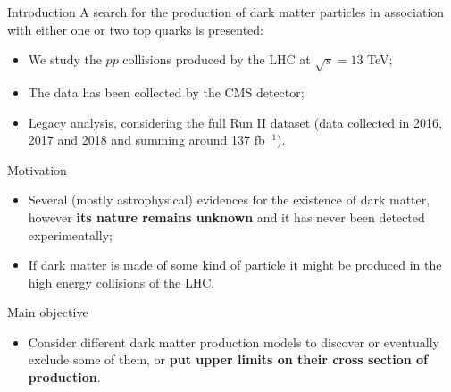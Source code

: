 \documentclass[8pt]{beamer}
\begin{document}
\begin{frame}{Introduction}
\justifying
A search for the \alert{production of dark matter particles in association with either one or two top quarks} is presented:

\vspace{-5pt}
\begin{itemize}
\justifying
\item We study the $pp$ collisions produced by the LHC at $\sqrt{s} = 13$ TeV;
\item The data has been collected by the CMS detector;
\item Legacy analysis, considering the full Run II dataset (data collected in 2016, 2017 and 2018 and summing around 137 fb$^{-1}$).
\end{itemize} \vfill

\begin{block}{\centering Motivation}\end{block}
\vspace{-5pt}
\begin{itemize}
\justifying
\item Several (mostly astrophysical) evidences for the existence of dark matter, however \textbf{its nature remains unknown} and it has never been detected experimentally;
\item If dark matter is made of some kind of particle it might be produced in the high energy collisions of the LHC.
\end{itemize} \vfill

\begin{block}{ \centering Main objective}\end{block}
\vspace{-5pt}
\begin{itemize}
\justifying
\item Consider different dark matter production models to discover or eventually exclude some of them, or \textbf{put upper limits on their cross section of production}.
\end{itemize} \vfill
\end{frame}
\end{document}
